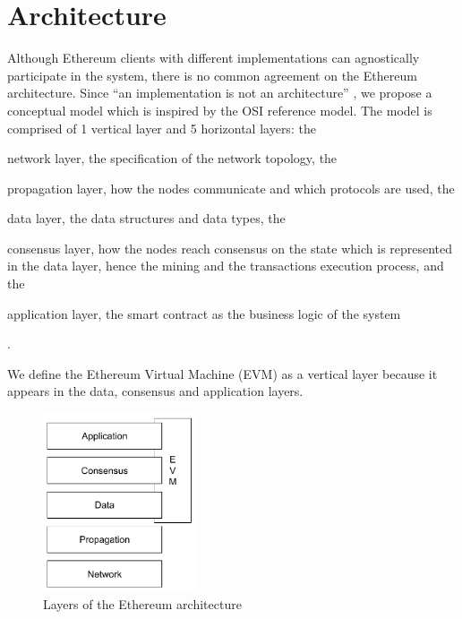 \section{Architecture}

Although Ethereum clients with different implementations can agnostically
participate in the system, there is no common agreement on the Ethereum
architecture. Since ``an implementation is not an architecture''
\cite{bib:art-of-scalability}, we propose a conceptual model which is inspired
by the OSI reference model. The model is comprised of 1 vertical layer and 5
horizontal layers: the
\begin{enumerate*}[label=(\arabic*)]
  \item network layer, the specification of the network topology, the
  \item propagation layer, how the nodes communicate and which protocols
  are used, the
  \item data layer, the data structures and data types, the
  \item consensus layer, how the nodes reach consensus on the state which is
  represented in the data layer, hence the mining and the transactions execution
  process, and the
  \item application layer, the smart contract as the business logic of the
  system
\end{enumerate*}.

We define the Ethereum Virtual Machine (EVM) as a vertical layer because it
appears in the data, consensus and application layers.

\begin{figure}[H]
	\begin{center}
		\includegraphics[width=0.4\textwidth]{./res/img/architecture.pdf}
	\end{center}
	\caption{Layers of the Ethereum architecture}
	\label{fig:architecture}
\end{figure}

